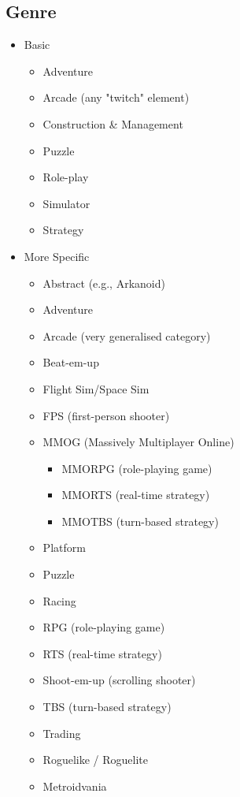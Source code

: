 \subsection{Genre}

\begin{itemize}[label=\textbullet]
  \item Basic
  \begin{itemize}[label=$\circ$]
    \item Adventure
    \item Arcade (any "twitch" element)
    \item Construction \& Management
    \item Puzzle
    \item Role-play
    \item Simulator
    \item Strategy
  \end{itemize}
  \item More Specific
  \begin{itemize}[label=$\circ$]
    \item Abstract (e.g., Arkanoid)
    \item Adventure
    \item Arcade (very generalised category)
    \item Beat-em-up
    \item Flight Sim/Space Sim
    \item FPS (first-person shooter)
    \item MMOG (Massively Multiplayer Online)
    \begin{itemize}[label=\sqbullet]
      \item MMORPG (role-playing game)
      \item MMORTS (real-time strategy)
      \item MMOTBS (turn-based strategy)
    \end{itemize}
    \item Platform
    \item Puzzle
    \item Racing
    \item RPG (role-playing game)
    \item RTS (real-time strategy)
    \item Shoot-em-up (scrolling shooter)
    \item TBS (turn-based strategy)
    \item Trading
    \item Roguelike / Roguelite
    \item Metroidvania

\end{itemize}
\end{itemize}
